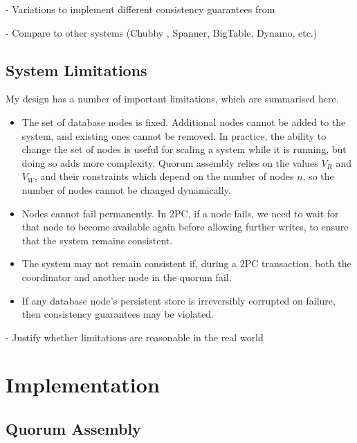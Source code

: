 \documentclass[12pt,a4paper,twoside,openright]{report}
\begin{document}
- Variations to implement different consistency guarantees from \cite{terry2013}


- Compare to other systems (Chubby \cite{27897}, Spanner, BigTable, Dynamo, etc.)

\section*{System Limitations}

My design has a number of important limitations, which are summarised here.

\begin{itemize}
\item
The set of database nodes is fixed. Additional nodes cannot be added to the system, and existing ones cannot be removed. In practice, the ability to change the set of nodes is useful for scaling a system while it is running, but doing so adds more complexity. Quorum assembly relies on the values $V_R$ and $V_W$, and their constraints which depend on the number of nodes $n$, so the number of nodes cannot be changed dynamically.

\item
Nodes cannot fail permanently. In 2PC, if a node fails, we need to wait for that node to become available again before allowing further writes, to ensure that the system remains consistent.

\item
The system may not remain consistent if, during a 2PC transaction, both the coordinator and another node in the quorum fail.

\item
If any database node's persistent store is irreversibly corrupted on failure, then consistency guarantees may be violated.

\end{itemize}

  - Justify whether limitations are reasonable in the real world \cite{imbriaco_2012}


\chapter{Implementation}

\section{Quorum Assembly}
\end{document}
